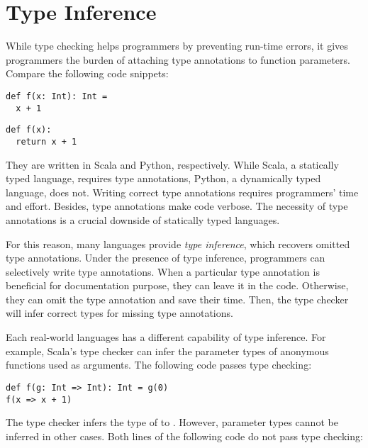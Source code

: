 \setchapterpreamble[u]{\margintoc}
\chapter{Type Inference}

\renewcommand{\plang}{\textsf{TFAE}\xspace}
\renewcommand{\lang}{\textsf{TIFAE}\xspace}

While type checking helps programmers by preventing run-time errors, it gives
programmers the burden of attaching type annotations to function parameters.
Compare the following code snippets:

\begin{verbatim}
def f(x: Int): Int =
  x + 1
\end{verbatim}

\begin{verbatim}
def f(x):
  return x + 1
\end{verbatim}

They are written in Scala and Python, respectively. While Scala, a statically
typed language, requires type annotations, Python, a dynamically typed language,
does not. Writing correct type annotations requires programmers' time and
effort. Besides, type annotations make code verbose. The necessity of type
annotations is a crucial downside of statically typed languages.

For this reason, many languages provide \textit{type inference}, which recovers omitted type annotations. Under the presence of type
inference, programmers can selectively write type annotations. When a particular
type annotation is beneficial for documentation purpose, they can leave it in
the code. Otherwise, they can omit the type annotation and save their time.
Then, the type checker will infer correct types for missing type annotations.

Each real-world languages has a different capability of type inference. For
example, Scala's type checker can infer the parameter types of anonymous
functions used as arguments. The following code passes type checking:

\begin{verbatim}
def f(g: Int => Int): Int = g(0)
f(x => x + 1)
\end{verbatim}

The type checker infers the type of  to . However, parameter
types cannot be inferred in other cases. Both lines of the following code do
not pass type checking:

